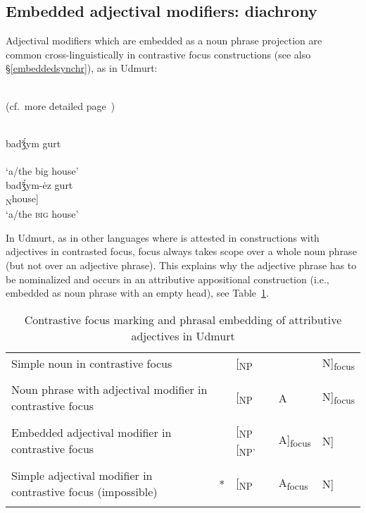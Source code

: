 \subsection{Embedded adjectival modifiers: diachrony}
\label{embeddeddiachr}
Adjectival modifiers which are embedded as a noun phrase projection are common cross-linguistically in contrastive focus constructions (see also \S\ref{embeddedsynchr}), as in Udmurt:
\begin{exe}
\\{\rm (cf.~more detailed page~\pageref{udmurt synchr})}
\begin{xlist}
\\
\gll	{}		badǯ́ym gurt\\
	[\textsubscript{NP} \textsubscript{A}big \textsubscript{N}house]\\
\glt	‘a/the big house’
\\
\gll	{}		{}			badǯ́ym-ėz gurt\\
	[\textsubscript{NP} [\textsubscript{NP'} \textsubscript{A}big-\textsc{nmlz}] \textsubscript{N}house]\\
\glt	‘a/the \textsc{big} house’
\end{xlist}
\end{exe}

In Udmurt, as in other languages where  is attested in constructions with adjectives in contrasted focus, focus always takes scope over a whole noun phrase (but not over an adjective phrase). This explains why the adjective phrase has to be nominalized and occurs in an attributive appositional construction (i.e., embedded as noun phrase with an empty head), see Table~\ref{udm-nom}.
\begin{table}
\begin{tabularx}{\textwidth}{p{} >{\large}r >{\large}X >{\large}X >{\large}X}
\lsptoprule
\raggedright
Simple noun in contrastive focus					&	&[\textsubscript{NP} 					&					&N]\textsubscript{focus}\\
\\
\raggedright
Noun phrase with adjectival modifier in contrastive focus	&	&[\textsubscript{NP} 					&A 					&N]\textsubscript{focus}\\
\\
\raggedright
Embedded adjectival modifier in contrastive focus		&	&[\textsubscript{NP} [\textsubscript{NP'} 	&A]\textsubscript{focus} 	&N]\\
\\
\raggedright
Simple adjectival modifier in contrastive focus (impossible)&{*}	&[\textsubscript{NP} 					&A\textsubscript{focus} 	&N]\\
\lspbottomrule
\end{tabularx}
\caption[Contrastive focus and phrasal embedding]{Contrastive focus marking and phrasal embedding of attributive adjectives in Udmurt}
\label{udm-nom}
\end{table}

